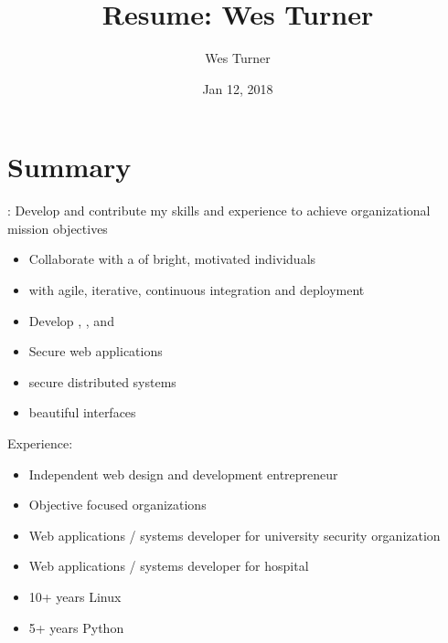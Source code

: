 \documentclass[letter,,openany,oneside,english]{sphinxhowto}
\title{Resume: Wes Turner}
\date{Jan 12, 2018}
\author{Wes Turner}
\begin{document}
\maketitle
\sphinxtableofcontents
{}\label{\detokenize{resume::doc}}

\newpage

\section{Summary}
\label{\detokenize{resume:summary}}\label{\detokenize{resume:id1}}

: Develop and contribute my skills and experience to
achieve organizational mission objectives

\begin{itemize}
\item {} 
Collaborate with a  of bright, motivated individuals

\item {} 
 with agile, iterative, continuous integration and deployment

\item {} 
Develop , , and 

\item {} 
Secure web applications

\item {} 
 secure distributed systems

\item {} 
 beautiful interfaces

\end{itemize}

Experience:
\begin{itemize}
\item {} 
Independent web design and development entrepreneur

\item {} 
Objective focused organizations

\item {} 
Web applications / systems developer for university security organization

\item {} 
Web applications / systems developer for hospital

\item {} 
10+ years Linux

\item {} 
5+ years Python

\end{itemize}
\newpage
\end{document}
